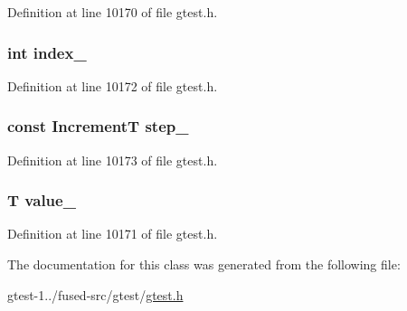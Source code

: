 \-Definition at line 10170 of file gtest.\-h.

\hypertarget{classtesting_1_1internal_1_1RangeGenerator_1_1Iterator_aaaf1ac02dfa554a3cdffc647d512a77b}{
\subsubsection[{index\-\_\-}]{\setlength{\rightskip}{0pt plus 5cm}int {\bf index\-\_\-}}}\label{d5/dfa/classtesting_1_1internal_1_1RangeGenerator_1_1Iterator_aaaf1ac02dfa554a3cdffc647d512a77b}


\-Definition at line 10172 of file gtest.\-h.

\hypertarget{classtesting_1_1internal_1_1RangeGenerator_1_1Iterator_ab1ed3e7cdff8cb7dd4d077c865a66c1a}{
\subsubsection[{step\-\_\-}]{\setlength{\rightskip}{0pt plus 5cm}const \-Increment\-T {\bf step\-\_\-}}}\label{d5/dfa/classtesting_1_1internal_1_1RangeGenerator_1_1Iterator_ab1ed3e7cdff8cb7dd4d077c865a66c1a}


\-Definition at line 10173 of file gtest.\-h.

\hypertarget{classtesting_1_1internal_1_1RangeGenerator_1_1Iterator_ae496c0f6edafccdab7ef2e2b9d0c7e03}{
\subsubsection[{value\-\_\-}]{\setlength{\rightskip}{0pt plus 5cm}\-T {\bf value\-\_\-}}}\label{d5/dfa/classtesting_1_1internal_1_1RangeGenerator_1_1Iterator_ae496c0f6edafccdab7ef2e2b9d0c7e03}


\-Definition at line 10171 of file gtest.\-h.



\-The documentation for this class was generated from the following file\-:\begin{DoxyCompactItemize}
\item 
gtest-\/1../fused-\/src/gtest/\hyperlink{fused-src_2gtest_2gtest_8h}{gtest.\-h}\end{DoxyCompactItemize}

